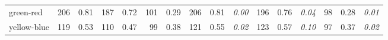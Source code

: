 {\begin{tabular*}{\textwidth}{@{}p{17.5mm}|rl|rl|rl||rll|rll|rll@{}}
    green-red & 206 & 0.81 & 187 & 0.72 & 101 & 0.29
    & 206 & 0.81 & \itshape\textcolor{dark}{0.00}
    & 196 & 0.76 & \itshape\textcolor{dark}{0.04}
    & 98 & 0.28 & \itshape\textcolor{dark}{0.01} \\
    yellow-blue & 119 & 0.53 & 110 & 0.47 & 99 & 0.38
    & 121 & 0.55 & \itshape\textcolor{dark}{0.02}
    & 123 & 0.57 & \itshape\textcolor{dark}{0.10}
    & 97 & 0.37 & \itshape\textcolor{dark}{0.02} \\
    \hline
  \end{tabular*}
  \vspace{3mm}
  
}


